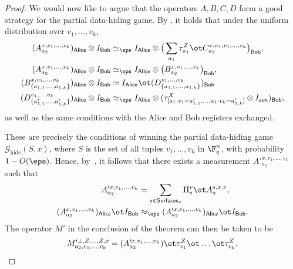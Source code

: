 \documentclass[11pt]{article}
\newcommand{\game}{\mathscr{G}}
\newcommand{\reg}[1]{{\mathsf{#1}}}
\newcommand{\surfaces}[1]{\mathsf{Surfaces}_{#1}}
\begin{document}
\begin{proof}
    We would now like to argue that the operators $A,
    B, C, D$ form a good strategy for the partial data-hiding game. By
    , it holds that under the uniform
    distribution over $v_1, \dots, v_k$,
    \begin{align*}
      (A^{x, v_1,\dots, v_k}_{a_2})_{\reg{Alice}} \otimes I_{\reg{Bob}}&\simeq_{\eps} I_{\reg{Alice}} \otimes \big(\sum_{a_1}
                                    \tau^Z_{a_1} \ot C^{x,
                                    a_1, v_1, \dots, v_k}_{a_2}\big)_{\reg{Bob}}, \\
      (A^{x, v_1, \dots, v_k}_{a_2})_{\reg{Alice}} \otimes I_{\reg{Bob}} &\simeq_{\eps} I_{\reg{Alice}} \otimes \big(
      				B^{x, v_1, \dots,
                                                                           v_k}_{a_2}\big)_{\reg{Bob}}, \\
      (B^{x, v_1, \dots, v_k}_{\{a_{1,1}, \dots,
      a_{1,k}\}})_{\reg{Alice}} \otimes I_{\reg{Bob}} &\simeq
                                                        I_{\reg{Alice}}
                                                        \ot (D^{v_1,
                                                        \dots,
                                                        v_k}_{\{a_{1,1},
                                                        \dots,
                                                        a_{1,k}\}})_{\reg{Bob}} \\
     (D^{ v_1, \dots, v_k}_{\{a'_{1,1}, \dots, a'_{1,k}\}})_{\reg{Alice}} \otimes I_{\reg{Bob}}
                                  &\simeq_{\eps} I_{\reg{Alice}} \otimes (\tau^X_{[a_1 \cdot
                                    v_1 = a'_{1,1}, \dots, a_1 \cdot
                                    v_k = a'_{1,k}]} \otimes
                                    I_{\reg{aux}})_{\reg{Bob}},
    \end{align*}
    as well as the same conditions with the Alice and Bob registers
    exchanged.
    
    These are precisely the conditions of winning the partial data-hiding game
    $\game_{\mathrm{hide}}(S,x)$, where $S$ is the set of all tuples
    $v_1, \dots, v_k$ in $\F_q^n$, with probability $1 -
    O(\eps)$. Hence, by~, it follows
    that there exists a measurement $A'^{x, v_1, \dots, v_k}_{a_2}$
    such that
    \begin{align*}
      A'^{x,v _1, \dots, v_k}_{a_2} &= \sum_{s \in
                                                       \surfaces{v}}
                                                       \Pi^{v}_s \ot
                                                       A^{s,x,v}_a,\\
      (A^{x,v_1, \dots, v_k}_{a_2})_{\reg{Alice}} \ot I_{\reg{Bob}} &\approx_{\eps} (A'^{x, v_1,
                                                      \dots, v_k}_{a_2})_{\reg{Alice}} \ot I_{\reg{Bob}}.
    \end{align*}
    The operator $M'$ in the conclusion of the theorem can then be
    taken to be
    \[M'^{\bot, Z, \dots, Z, x}_{a_2, v_1, \dots, v_k}  =
    (A'^{x,v_1, \dots, v_k}_{a_2}) \ot \tau^Z_{v_1} \ot \dots \ot
    \tau^Z_{v_k}. \qedhere\]
  \end{proof}
\end{document}
